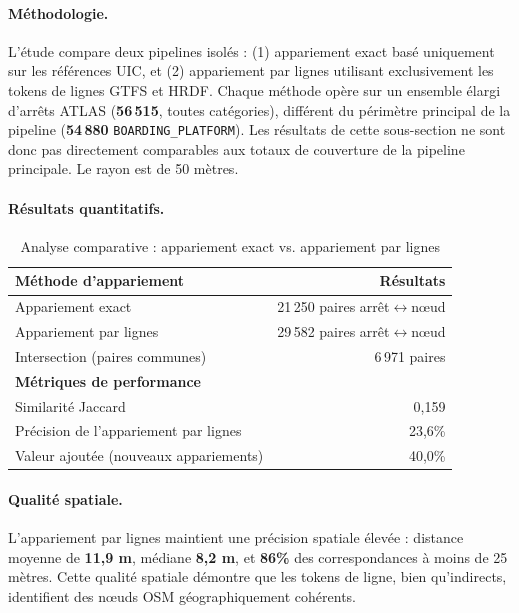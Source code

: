 \paragraph{Méthodologie.} L'étude compare deux pipelines isolés : (1) appariement exact basé uniquement sur les références UIC, et (2) appariement par lignes utilisant exclusivement les tokens de lignes GTFS et HRDF. Chaque méthode opère sur un ensemble élargi d'arrêts ATLAS (\textbf{56\,515}, toutes catégories), différent du périmètre principal de la pipeline (\textbf{54\,880} \texttt{BOARDING\_PLATFORM}). Les résultats de cette sous-section ne sont donc pas directement comparables aux totaux de couverture de la pipeline principale. Le rayon est de 50 mètres.

\paragraph{Résultats quantitatifs.}

\begin{table}[H]
\centering
\begin{tabular}{lr}
\toprule
\textbf{Méthode d'appariement} & \textbf{Résultats} \\
\midrule
Appariement exact & 21\,250 paires arrêt$\leftrightarrow$nœud \\
Appariement par lignes & 29\,582 paires arrêt$\leftrightarrow$nœud \\
Intersection (paires communes) & 6\,971 paires \\
\midrule
\textbf{Métriques de performance} & \\
\midrule
Similarité Jaccard & 0,159 \\
Précision de l'appariement par lignes & 23,6\% \\
Valeur ajoutée (nouveaux appariements) & 40,0\% \\
\bottomrule
\end{tabular}
\caption{Analyse comparative : appariement exact vs. appariement par lignes}
\label{tab:route_vs_exact_comparison}
\end{table}

\paragraph{Qualité spatiale.} L'appariement par lignes maintient une précision spatiale élevée : distance moyenne de \textbf{11,9 m}, médiane \textbf{8,2 m}, et \textbf{86\%} des correspondances à moins de 25 mètres. Cette qualité spatiale démontre que les tokens de ligne, bien qu'indirects, identifient des nœuds OSM géographiquement cohérents.

